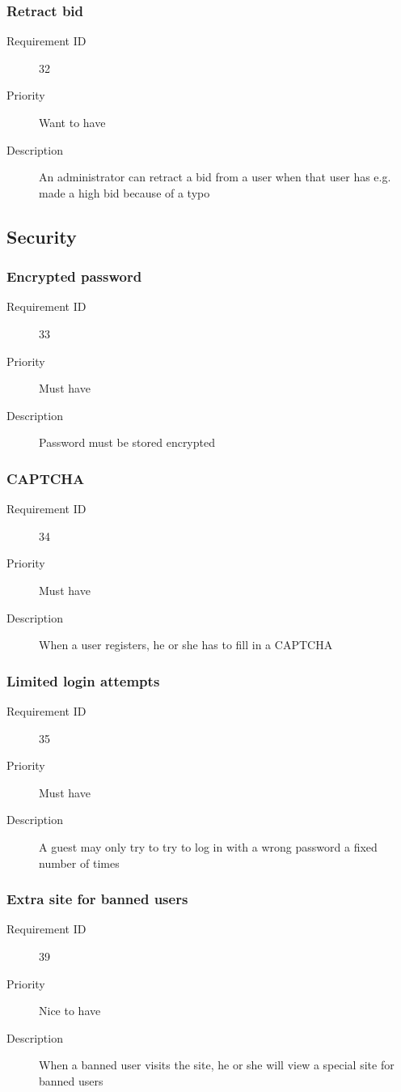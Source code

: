 		\subsubsection{Retract bid}
			\begin{description}
				\item[Requirement ID] 32
				\item[Priority] Want to have
				\item[Description] An administrator can retract a bid from a user when that user has e.g. 
					made a high bid because of a typo
			\end{description}
	\subsection{Security}
		\subsubsection{Encrypted password}
			\begin{description}
				\item[Requirement ID] 33
				\item[Priority] Must have
				\item[Description] Password must be stored encrypted
			\end{description}
		\subsubsection{CAPTCHA}
			\begin{description}
				\item[Requirement ID] 34
				\item[Priority] Must have
				\item[Description] When a user registers, he or she has to fill in a CAPTCHA
			\end{description}
		\subsubsection{Limited login attempts}
			\begin{description}
				\item[Requirement ID] 35
				\item[Priority] Must have
				\item[Description] A guest may only try to try to log in with a wrong password 
					a fixed number of times
			\end{description}
		\subsubsection{Extra site for banned users}
			\begin{description}
				\item[Requirement ID] 39
				\item[Priority] Nice to have
				\item[Description] When a banned user visits the site, he or she will view a special
					site for banned users
			\end{description}
